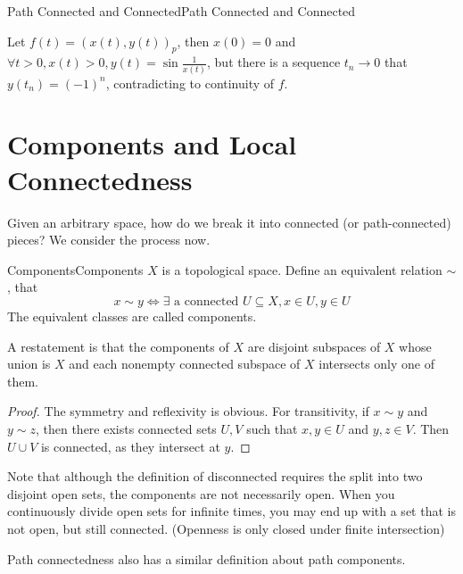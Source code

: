 \documentclass[../main.tex]{subfiles}
\begin{document}
\begin{example}{Path Connected and Connected}{Path Connected and Connected}
\begin{itemize}
	Let $f(t) = (x(t),y(t))_p$, then $x(0) = 0$ and $\forall t>0, x(t)>0,y(t) = \sin \frac{1}{x(t)}$, but there is a sequence $t_n \rightarrow 0$ that $y(t_n) = (-1)^n$, contradicting to continuity of $f$.
\end{itemize}
\end{example}

\section{Components and Local Connectedness}

Given an arbitrary space, how do we break it into connected (or path-connected) pieces? We consider the process now.

\begin{definition}{Components}{Components}
$X$ is a topological space. Define an equivalent relation $\sim$, that
\begin{equation*}
x\sim y \Leftrightarrow \exists \text{ a connected } U \subseteq X, x\in U,y\in U
\end{equation*}
The equivalent classes are called components.

A restatement is that the components of $X$ are disjoint subspaces of $X$ whose union is $X$ and each nonempty connected subspace of $X$ intersects only one of them.
\end{definition}
\begin{proof}
The symmetry and reflexivity is obvious. For transitivity, if $x\sim y$ and $y\sim z$, then there exists connected sets $U,V$ such that $x,y\in U$ and $y,z\in V$. Then $U\cup V$ is connected, as they intersect at $y$.
\end{proof}

\begin{remark}
	Note that although the definition of disconnected requires the split into two disjoint open sets, the components are not necessarily open. When you continuously divide open sets for infinite times, you may end up with a set that is not open, but still connected. (Openness is only closed under finite intersection)
\end{remark}

Path connectedness also has a similar definition about path components.
\end{document}
